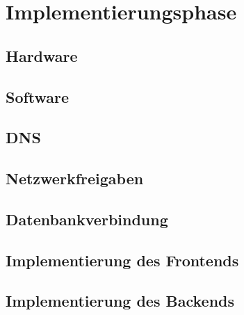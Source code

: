 \section{Implementierungsphase}

	\subsection{Hardware}
	\subsection{Software}
	\subsection{DNS}
	\subsection{Netzwerkfreigaben}
	\subsection{Datenbankverbindung}
	\subsection{Implementierung des Frontends}
	\subsection{Implementierung des Backends}
